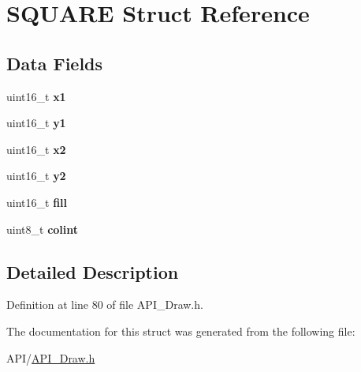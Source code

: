 \hypertarget{struct_s_q_u_a_r_e}{}\section{S\+Q\+U\+A\+RE Struct Reference}
\label{struct_s_q_u_a_r_e}
\subsection*{Data Fields}
\begin{DoxyCompactItemize}
\item 
\mbox{\label{struct_s_q_u_a_r_e_aedb5fdfe3c1d1a915b668ba7f3950753}} 
uint16\+\_\+t {\bfseries x1}
\item 
\mbox{\label{struct_s_q_u_a_r_e_a47ada631c22a9d40348069145654f255}} 
uint16\+\_\+t {\bfseries y1}
\item 
\mbox{\label{struct_s_q_u_a_r_e_ac5bc000f8954f38b7a641a485a26bae7}} 
uint16\+\_\+t {\bfseries x2}
\item 
\mbox{\label{struct_s_q_u_a_r_e_aa377184ba406b3f0c4ac18c935378204}} 
uint16\+\_\+t {\bfseries y2}
\item 
\mbox{\label{struct_s_q_u_a_r_e_abd83f5d2f2e1a767233d92cba99540f5}} 
uint16\+\_\+t {\bfseries fill}
\item 
\mbox{\label{struct_s_q_u_a_r_e_a21caa4b27a71b7967f1a2d64f196a674}} 
uint8\+\_\+t {\bfseries colint}
\end{DoxyCompactItemize}


\subsection{Detailed Description}


Definition at line 80 of file A\+P\+I\+\_\+\+Draw.\+h.



The documentation for this struct was generated from the following file\+:\begin{DoxyCompactItemize}
\item 
A\+P\+I/\hyperlink{_a_p_i___draw_8h}{A\+P\+I\+\_\+\+Draw.\+h}\end{DoxyCompactItemize}

